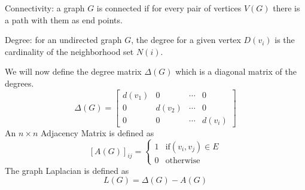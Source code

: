 \documentclass{article}
\begin{document}
Connectivity: a graph $G$ is connected if for every pair of vertices $V(G)$
there is a path with them as end points. 

Degree: for an undirected graph $G$, the degree for a given vertex $D(v_i)$ is
the cardinality of the neighborhood set $N(i)$. 

We will now define the degree matrix $\Delta(G)$ which is a diagonal matrix of
the degrees. 
\[ \Delta(G) = \begin{bmatrix} d(v_1) & 0 & \cdots & 0 \\
0 & d(v_2) & \cdots & 0 \\
0 & 0 & \cdots & d(v_i) \end{bmatrix} \]
An $n \times n$ Adjacency Matrix is defined as 
\[ {[A(G)]}_{ij} = 
    \begin{cases} 1 &\text{if}(v_i, v_j) \in E \\
        0 &\text{otherwise}
            \end{cases} 
\]
The graph Laplacian is defined as
\[ L(G) = \Delta(G) - A(G) \]
\end{document}
